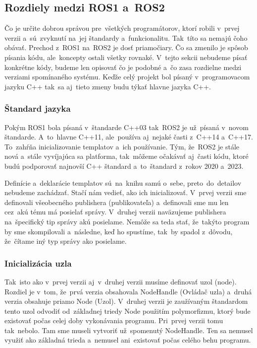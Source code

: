 \subsection{Rozdiely medzi ROS1 a~ROS2}

Čo je určite dobrou správou pre~všetkých programátorov, ktorí robili v~prvej verzii a~sú~zvyknutí na~jej štandardy a~funkcionalitu. Tak~títo
sa nemajú čoho obávať. Prechod z~ROS1 na~ROS2 je dosť priamočiary. Čo sa zmenilo je spôsob písania kódu, ale~koncepty ostali všetky rovnaké.
V~tejto sekcii nebudeme písať konkrétne kódy, budeme len opisovať čo je podobné a~čo zasa rozdielne medzi verziami spomínaného systému. Keďže
celý projekt bol písaný v~programovacom jazyku C++ tak~sa aj~tieto zmeny budu týkať hlavne jazyka C++.

\subsubsection{Štandard jazyka}

	Pokým ROS1 bola písaná v~štandarde C++03 tak~ROS2 je už~písaná v~novom štandarde. A~to~hlavne C++11, ale~používa aj~nejaké časti z~C++14
	a~C++17. To~zahŕňa inicializovanie templatov a~ich používanie. Tým, že~ROS2 je stále nová a~stále vyvíjajúca sa platforma, tak~môžeme očakávať aj~časti
	kódu, ktoré budú podporovať najnovší C++ štandard a~to~štandard z~rokov 2020 a~2023.

	Definície a~deklarácie templatov sú~na~knihu samú o~sebe, preto~do~detailov nebudeme zachádzať. Stačí nám vedieť, ako ich inicializovať.
	V~prvej verzii sme definovali všeobecného publishera (publikovateľa) a~definovali sme mu len cez~akú tému má posielať správy. V~druhej verzii
	naväzujeme publishera na~špecifický tip správy akú posielame. Nemôže sa teda stať, že~takýto program by sme skompilovali a~následne, keď
	ho spustíme, tak~by spadol z~dôvodu, že~čítame iný typ správy ako posielame.

\subsubsection{Inicializácia uzla}

	Tak~isto ako v~prvej verzii aj~v~druhej verzii musíme definovať uzol (node). Rozdiel je v~tom, že~prvá verzia obsahovala NodeHandle (Ovládač uzla)
	a~druhá verzia obsahuje priamo Node (Uzol). V~druhej verzii je zaužívaným štandardom tento uzol odvodiť od~základnej
	triedy Node použitím polymorfizmu, ktorý bude existovať počas celej doby vykonávania programu. Pri~prvej verzii tomu
	tak~nebolo. Tam sme museli vytvoriť už~spomenutý NodeHandle. Ten sa nemusel využiť ako základná trieda a~nemusel
	ani~existovať počas celého behu programu.

